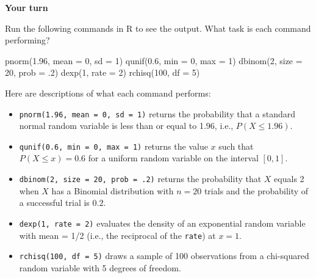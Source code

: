 \documentclass[
]{book}
\newenvironment{Shaded}{\begin{snugshade}}{\end{snugshade}}
\newcommand{\AttributeTok}[1]{\textcolor[rgb]{0.77,0.63,0.00}{#1}}
\newcommand{\DecValTok}[1]{\textcolor[rgb]{0.00,0.00,0.81}{#1}}
\newcommand{\FloatTok}[1]{\textcolor[rgb]{0.00,0.00,0.81}{#1}}
\newcommand{\FunctionTok}[1]{\textcolor[rgb]{0.00,0.00,0.00}{#1}}
\newcommand{\NormalTok}[1]{#1}
\providecommand{\tightlist}{%
  \setlength{\itemsep}{0pt}\setlength{\parskip}{0pt}}
\theoremstyle{definition}
\theoremstyle{definition}
\theoremstyle{definition}
\theoremstyle{definition}
\theoremstyle{remark}
\begin{document}
\begin{yourturn}

\textbf{Your turn}

Run the following commands in R to see the output. What task is each command performing?

\begin{Shaded}
\begin{Highlighting}[]
\FunctionTok{pnorm}\NormalTok{(}\FloatTok{1.96}\NormalTok{, }\AttributeTok{mean =} \DecValTok{0}\NormalTok{, }\AttributeTok{sd =} \DecValTok{1}\NormalTok{)}
\FunctionTok{qunif}\NormalTok{(}\FloatTok{0.6}\NormalTok{, }\AttributeTok{min =} \DecValTok{0}\NormalTok{, }\AttributeTok{max =} \DecValTok{1}\NormalTok{)}
\FunctionTok{dbinom}\NormalTok{(}\DecValTok{2}\NormalTok{, }\AttributeTok{size =} \DecValTok{20}\NormalTok{, }\AttributeTok{prob =}\NormalTok{ .}\DecValTok{2}\NormalTok{)}
\FunctionTok{dexp}\NormalTok{(}\DecValTok{1}\NormalTok{, }\AttributeTok{rate =} \DecValTok{2}\NormalTok{)}
\FunctionTok{rchisq}\NormalTok{(}\DecValTok{100}\NormalTok{, }\AttributeTok{df =} \DecValTok{5}\NormalTok{)}
\end{Highlighting}
\end{Shaded}

Here are descriptions of what each command performs:

\begin{itemize}
\tightlist
\item
  \texttt{pnorm(1.96,\ mean\ =\ 0,\ sd\ =\ 1)} returns the probability that a standard normal random variable is less than or equal to 1.96, i.e., \(P(X \leq 1.96)\).
\item
  \texttt{qunif(0.6,\ min\ =\ 0,\ max\ =\ 1)} returns the value \(x\) such that \(P(X\leq x) = 0.6\) for a uniform random variable on the interval \([0, 1]\).
\item
  \texttt{dbinom(2,\ size\ =\ 20,\ prob\ =\ .2)} returns the probability that \(X\) equals 2 when \(X\) has a Binomial distribution with \(n=20\) trials and the probability of a successful trial is \(0.2\).
\item
  \texttt{dexp(1,\ rate\ =\ 2)} evaluates the density of an exponential random variable with mean = 1/2 (i.e., the reciprocal of the \texttt{rate}) at \(x=1\).
\item
  \texttt{rchisq(100,\ df\ =\ 5)} draws a sample of 100 observations from a chi-squared random variable with 5 degrees of freedom.
\end{itemize}

\end{yourturn}
\end{document}
